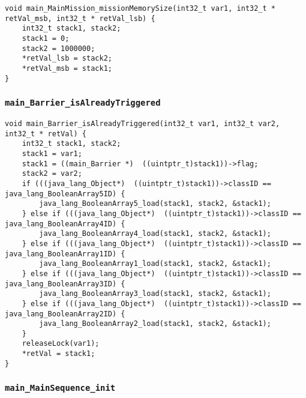 \begin{landscape}
\begin{multicols}{2}
\begin{lstlisting}[firstnumber=1262]
void main_MainMission_missionMemorySize(int32_t var1, int32_t * retVal_msb, int32_t * retVal_lsb) {
	int32_t stack1, stack2;
	stack1 = 0;
	stack2 = 1000000;
	*retVal_lsb = stack2;
	*retVal_msb = stack1;
}  
\end{lstlisting}

\subsubsection{\texttt{main\_Barrier\_isAlreadyTriggered}}

\begin{lstlisting}[firstnumber=1270]
void main_Barrier_isAlreadyTriggered(int32_t var1, int32_t var2, int32_t * retVal) {
	int32_t stack1, stack2;
	stack1 = var1;
	stack1 = ((main_Barrier *)  ((uintptr_t)stack1))->flag;
	stack2 = var2;
	if (((java_lang_Object*)  ((uintptr_t)stack1))->classID == java_lang_BooleanArray5ID) {
		java_lang_BooleanArray5_load(stack1, stack2, &stack1);
	} else if (((java_lang_Object*)  ((uintptr_t)stack1))->classID == java_lang_BooleanArray4ID) {
		java_lang_BooleanArray4_load(stack1, stack2, &stack1);
	} else if (((java_lang_Object*)  ((uintptr_t)stack1))->classID == java_lang_BooleanArray1ID) {
		java_lang_BooleanArray1_load(stack1, stack2, &stack1);
	} else if (((java_lang_Object*)  ((uintptr_t)stack1))->classID == java_lang_BooleanArray3ID) {
		java_lang_BooleanArray3_load(stack1, stack2, &stack1);
	} else if (((java_lang_Object*)  ((uintptr_t)stack1))->classID == java_lang_BooleanArray2ID) {
		java_lang_BooleanArray2_load(stack1, stack2, &stack1);
	}
	releaseLock(var1);
	*retVal = stack1;
}
\end{lstlisting}

\subsubsection{\texttt{main\_MainSequence\_init}}


\end{multicols}
\end{landscape}
